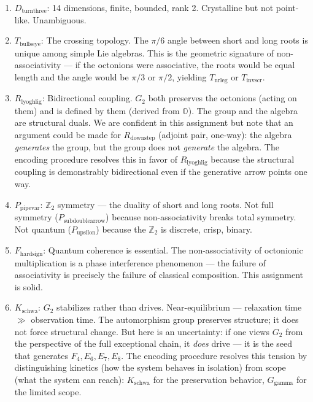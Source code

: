 \documentclass[12pt,a4paper]{article}
\begin{document}
\begin{enumerate}
    \item \textbf{$D_{\text{turnthree}}$}: 14 dimensions, finite, bounded, rank 2. Crystalline but not point-like. Unambiguous.
    \item \textbf{$T_{\text{bullseye}}$}: The crossing topology. The $\pi/6$ angle between short and long roots is unique among simple Lie algebras. This is the geometric signature of non-associativity --- if the octonions were associative, the roots would be equal length and the angle would be $\pi/3$ or $\pi/2$, yielding $T_{\text{nrleg}}$ or $T_{\text{invscr}}$.
    \item \textbf{$R_{\text{lyoghlig}}$}: Bidirectional coupling. $G_2$ both preserves the octonions (acting on them) and is defined by them (derived from $\mathbb{O}$). The group and the algebra are structural duals. We are confident in this assignment but note that an argument could be made for $R_{\text{downstep}}$ (adjoint pair, one-way): the algebra \emph{generates} the group, but the group does not \emph{generate} the algebra. The encoding procedure resolves this in favor of $R_{\text{lyoghlig}}$ because the structural coupling is demonstrably bidirectional even if the generative arrow points one way.
    \item \textbf{$P_{\text{pipevar}}$}: $\mathbb{Z}_2$ symmetry --- the duality of short and long roots. Not full symmetry ($P_{\text{subdoublearrow}}$) because non-associativity breaks total symmetry. Not quantum ($P_{\text{upsilon}}$) because the $\mathbb{Z}_2$ is discrete, crisp, binary.
    \item \textbf{$F_{\text{hardsign}}$}: Quantum coherence is essential. The non-associativity of octonionic multiplication is a phase interference phenomenon --- the failure of associativity is precisely the failure of classical composition. This assignment is solid.
    \item \textbf{$K_{\text{schwa}}$}: $G_2$ stabilizes rather than drives. Near-equilibrium --- relaxation time $\gg$ observation time. The automorphism group preserves structure; it does not force structural change. But here is an uncertainty: if one views $G_2$ from the perspective of the full exceptional chain, it \emph{does} drive --- it is the seed that generates $F_4, E_6, E_7, E_8$. The encoding procedure resolves this tension by distinguishing kinetics (how the system behaves in isolation) from scope (what the system can reach): $K_{\text{schwa}}$ for the preservation behavior, $G_{\text{gamma}}$ for the limited scope.

\end{enumerate}
\end{document}
